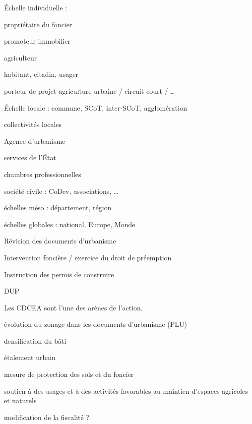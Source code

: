 \startcolumns[2]
\startitemize[a,packed]

\item Échelle individuelle :

	\startitemize[packed]
		\item propriétaire du foncier
		\item promoteur immobilier
		\item agriculteur
		\item habitant, citadin, usager
		\item porteur de projet agriculture urbaine / circuit court / \dots
	\stopitemize

\column
\item Échelle locale : commune, SCoT, inter-SCoT, agglomération

	\startitemize[packed]

		\item collectivités locales
		\item Agence d'urbanisme
		\item services de l'État
		\item chambres professionnelles
		\item société civile : CoDev, associations, \dots

	\stopitemize

\item échelles méso : département, région

\item échelles globales : national, Europe, Monde

\stopitemize
\stopcolumns

\startcolumns[n=2]
\subject{Situations}


\startitemize[packed]

\item Révision des documents d'urbanisme
\item Intervention foncière / exercice du droit de préemption
\item Instruction des permis de construire
\item DUP

\stopitemize

Les CDCEA sont l'une des arènes de l'action.

\column
\subject{Résultats}

\startitemize[packed]

\item évolution du zonage dans les documents d'urbanisme (PLU)
\item densification du bâti
\item étalement urbain
\item mesure de protection des sols et du foncier
\item soutien à des usages et à des activités favorables
  au maintien d'espaces agricoles et naturels
\item modification de la fiscalité ?

